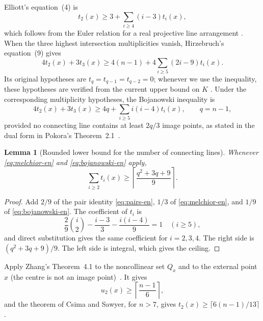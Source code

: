 \documentclass[11pt,a4paper]{article}
\newtheorem{lemma}[theorem]{Lemma}
\theoremstyle{definition}
\begin{document}
Elliott's equation~(4) is
\begin{equation}\label{eq:melchior-en}
t_2(x)\ge3+\sum_{i\ge4}(i-3)t_i(x),
\end{equation}
which follows from the Euler relation for a real projective line arrangement
\cite[Eq.~(4)]{elliott-en}.  When the three highest intersection multiplicities
vanish, Hirzebruch's equation~(9) gives
\begin{equation}\label{eq:hirz-en}
4t_2(x)+3t_3(x)\ge4(n-1)+4\sum_{i\ge5}(2i-9)t_i(x).
\end{equation}
Its original hypotheses are $t_q=t_{q-1}=t_{q-2}=0$; whenever we use the inequality,
these hypotheses are verified from the current upper bound on $K$
\cite[\S6, Eq.~(9)]{hirzebruch-en}.  Under the corresponding multiplicity
hypotheses, the Bojanowski inequality is
\begin{equation}\label{eq:bojanowski-en}
4t_2(x)+3t_3(x)\ge4q+\sum_{i\ge5}i(i-4)t_i(x),
\qquad q=n-1,
\end{equation}
provided no connecting line contains at least $2q/3$ image points, as stated in
the dual form in Pokora's Theorem~2.1~\cite[Theorem~2.1]{pokora-en}.

\begin{lemma}[Rounded lower bound for the number of connecting lines]
\label{lem:rounded-lines-en}
Whenever \eqref{eq:melchior-en} and \eqref{eq:bojanowski-en} apply,
\begin{equation}\label{eq:rounded-lines-en}
 \sum_{i\ge2}t_i(x)\ge
 \left\lceil\frac{q^2+3q+9}{9}\right\rceil .
\end{equation}
\end{lemma}

\begin{proof}
Add $2/9$ of the pair identity \eqref{eq:pairs-en}, $1/3$ of
\eqref{eq:melchior-en}, and $1/9$ of \eqref{eq:bojanowski-en}.  The coefficient
of $t_i$ is
\[
 \frac{2}{9}\binom i2-\frac{i-3}{3}-\frac{i(i-4)}9=1
 \quad(i\ge5),
\]
and direct substitution gives the same coefficient for $i=2,3,4$.  The
right side is $(q^2+3q+9)/9$.  The left side is integral, which gives the
ceiling.
\end{proof}

Apply Zhang's Theorem~4.1 to the noncollinear set $Q_x$ and to the external point
$x$ (the centre is not an image point)~\cite[Theorem~4.1]{zhang-en}.  It gives
\begin{equation}\label{eq:zhang-en}
u_2(x)\ge\left\lceil\frac{n-1}{6}\right\rceil,
\end{equation}
and the theorem of Csima and Sawyer, for $n>7$, gives
$t_2(x)\ge\lceil6(n-1)/13\rceil$
\cite[the theorem on pp.~187--188]{csima-sawyer-en}.
\end{document}
